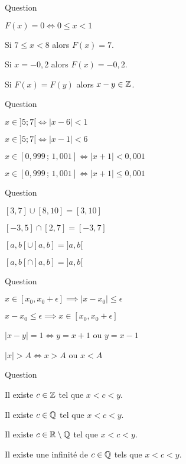 \begin{multi}[multiple,feedback=
{La partie fractionnaire est égale à la partie "après la virgule".
Par exemple \(F(12,3456) = 0,3456\).
}]{Question}
    \item \(F(x) = 0 \iff 0 \le x <1\)
    \item Si \(7 \le x <8\) alors \(F(x) = 7\).
    \item Si \(x=-0,2\) alors \(F(x) = -0,2\).
    \item* Si \(F(x)=F(y)\) alors \(x-y \in \mathbb{Z}\).
\end{multi}


\begin{multi}[multiple,feedback=
{\(|x-a| \le \epsilon \iff x \in [a-\epsilon,a+\epsilon]\)
}]{Question}
    \item* \(x \in ]5;7[ \iff |x-6|<1\)
    \item \(x \in ]5;7[ \iff |x-1|<6\)
    \item \(x \in [0,999 \, ; \, 1,001] \iff |x+1|<0,001\)
    \item \(x \in [0,999 \, ; \, 1,001] \iff |x+1|\le 0,001\)
\end{multi}


\begin{multi}[multiple,feedback=
{Tracer les intervalles sur la droite réelle pour mieux comprendre.
}]{Question}
    \item \([3,7] \cup [8,10] = [3,10]\)
    \item \([-3,5] \cap [2,7] = [-3,7]\)
    \item \([a,b[\cup ]a,b] = ]a,b[\)
    \item* \([a,b[\cap ]a,b] = ]a,b[\)
\end{multi}


\begin{multi}[multiple,feedback=
{\(|x-a| \le \epsilon \iff x \in [a-\epsilon,a+\epsilon]\)
}]{Question}
    \item* \(x \in [x_0,x_0+\epsilon] \implies |x-x_0| \le \epsilon\)
    \item \(x-x_0 \le \epsilon \implies x \in [x_0,x_0+\epsilon]\)
    \item* \(|x-y|=1 \iff y=x+1\) ou \(y=x-1\)
    \item \(|x| > A \iff x > A\) ou  \(x < A\)
\end{multi}


\begin{multi}[multiple,feedback=
{Entre deux nombres réels, il existe une infinité de rationnels et aussi une infinité de nombres irrationnels.
}]{Question}
    \item Il existe \(c\in\mathbb{Z}\) tel que \(x < c < y\).
    \item* Il existe \(c\in\mathbb{Q}\) tel que \(x < c < y\).
    \item* Il existe \(c\in\mathbb{R}\setminus\mathbb{Q}\) tel que \(x < c <y\).
    \item* Il existe une infinité de \(c\in\mathbb{Q}\) tels que \(x < c < y\).
\end{multi}


